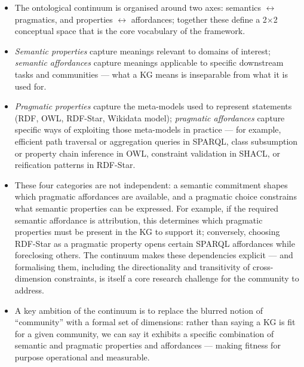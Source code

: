 \documentclass[runningheads]{llncs}
\begin{document}
\begin{itemize}
    \item The ontological continuum is organised around two axes: semantics $\leftrightarrow$ pragmatics, and properties $\leftrightarrow$ affordances; together these define a 2$\times$2 conceptual space that is the core vocabulary of the framework. %
    \item \textit{Semantic properties} capture meanings relevant to domains of interest; \textit{semantic affordances} capture meanings applicable to specific downstream tasks and communities --- what a KG means is inseparable from what it is used for. %
    \item \textit{Pragmatic properties} capture the meta-models used to represent statements (RDF, OWL, RDF-Star, Wikidata model); \textit{pragmatic affordances} capture specific ways of exploiting those meta-models in practice --- for example, efficient path traversal or aggregation queries in SPARQL, class subsumption or property chain inference in OWL, constraint validation in SHACL, or reification patterns in RDF-Star. %
	\item These four categories are not independent: a semantic commitment shapes which pragmatic affordances are available, and a pragmatic choice constrains what semantic properties can be expressed. For example, if the required semantic affordance is attribution, this determines which pragmatic properties must be present in the KG to support it; conversely, choosing RDF-Star as a pragmatic property opens certain SPARQL affordances while foreclosing others. The continuum makes these dependencies explicit --- and formalising them, including the directionality and transitivity of cross-dimension constraints, is itself a core research challenge for the community to address. %
    \item A key ambition of the continuum is to replace the blurred notion of ``community'' with a formal set of dimensions: rather than saying a KG is fit for a given community, we can say it exhibits a specific combination of semantic and pragmatic properties and affordances --- making fitness for purpose operational and measurable. %

\end{itemize}
\end{document}
